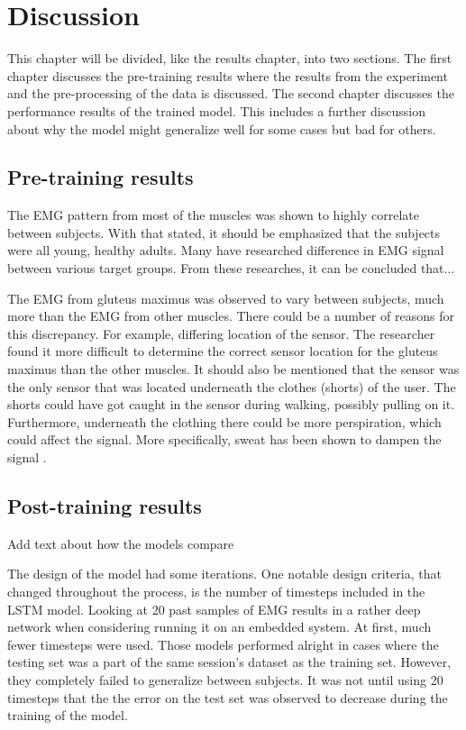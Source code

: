 \documentclass[../main.tex]{subfiles}
\begin{document}
\chapter{Discussion}
\label{sec:discussion}
This chapter will be divided, like the results chapter, into two sections. 
The first chapter discusses the pre-training results where the results from the experiment and the pre-processing of the data is discussed.
The second chapter discusses the performance results of the trained model.
This includes a further discussion about why the model might generalize well for some cases but bad for others.

\section{Pre-training results}
\label{sec:discussion_pre-training-results}
The \ac{EMG} pattern from most of the muscles was shown to highly correlate between subjects.
With that stated, it should be emphasized that the subjects were all young, healthy adults.
Many have researched difference in \ac{EMG} signal between various target groups.
From these researches, it can be concluded that...

The \ac{EMG} from gluteus maximus was observed to vary between subjects, much more than the \ac{EMG} from other muscles.
There could be a number of reasons for this discrepancy.
For example, differing location of the sensor.
The researcher found it more difficult to determine the correct sensor location for the gluteus maximus than the other muscles.
It should also be mentioned that the sensor was the only sensor that was located underneath the clothes (shorts) of the user.
The shorts could have got caught in the sensor during walking, possibly pulling on it.
Furthermore, underneath the clothing there could be more perspiration, which could affect the signal.
More specifically, sweat has been shown to dampen the signal \cite{Abdoli-Eramaki2012}.


\section{Post-training results}
\label{sec:discussion_post-training-results}
Add text about how the models compare

The design of the model had some iterations. 
One notable design criteria, that changed throughout the process, is the number of timesteps included in the \ac{LSTM} model.
Looking at 20 past samples of \ac{EMG} results in a rather deep network when considering running it on an embedded system.
At first, much fewer timesteps were used.
Those models performed alright in cases where the testing set was a part of the same session's dataset as the training set.
However, they completely failed to generalize between subjects.
It was not until using 20 timesteps that the the error on the test set was observed to decrease during the training of the model.
\end{document}
